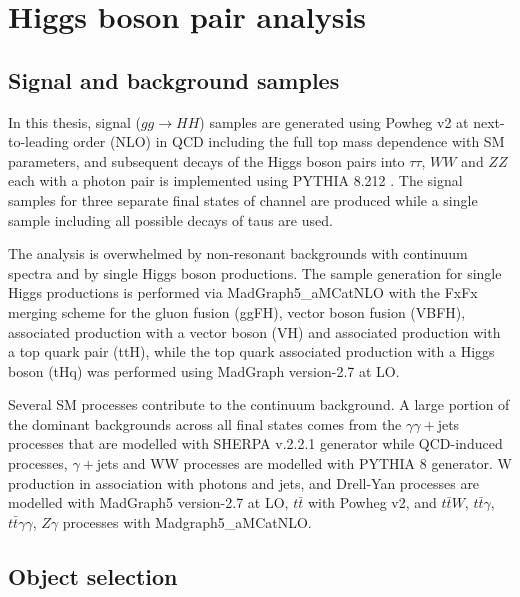 {\section{Higgs boson pair analysis}



\subsection{Signal and background samples}\label{samples_section}

In this thesis, signal ($gg \rightarrow HH$) samples are generated using Powheg v2 \cite{Nason2004, Frixione2007, Alioli2010, Heinrich2019} at next-to-leading order (NLO) in QCD including the full top mass dependence with SM parameters, and subsequent decays of the Higgs boson pairs into $\tau\tau$, $WW$ and $ZZ$ each with a photon pair is implemented using PYTHIA 8.212 \cite{Sjstrand2015}. The signal samples for three separate final states of \wwgg channel are produced while a single sample including all possible decays of taus are used.

The analysis is overwhelmed by non-resonant backgrounds with continuum \mgg spectra and by single Higgs boson productions. The sample generation for single Higgs productions is performed via MadGraph5\_aMCatNLO \cite{Alwall2014, Artoisenet2013} with the FxFx merging scheme \cite{Frederix2012} for the gluon fusion (ggFH), vector boson fusion (VBFH), associated production with a vector boson (VH) and associated production with a top quark pair (ttH), while the top quark associated production  with a Higgs boson (tHq) was performed using MadGraph version-2.7 at LO.

Several SM processes contribute to the continuum background. A large portion of the dominant backgrounds across all final states comes from the $\gamma\gamma+$jets processes that are modelled with SHERPA v.2.2.1 generator \cite{10.21468/SciPostPhys.7.3.034}while QCD-induced processes, $\gamma+$jets and WW processes are modelled with PYTHIA 8 generator. W production in association with photons and jets, and Drell-Yan processes are modelled with MadGraph5 version-2.7 at LO, $t\bar t$ with Powheg v2, and $t\bar tW$, $t\bar t\gamma$, $t\bar t\gamma\gamma$, $Z\gamma$ processes with Madgraph5\_aMCatNLO.

\subsection{Object selection}

}
